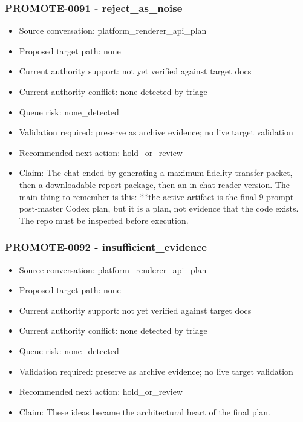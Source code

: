\documentclass[11pt,a4paper]{report}
\begin{document}
\subsubsection{PROMOTE-0091 - reject\_as\_noise}

\begin{itemize}
\item Source conversation: platform\_renderer\_api\_plan
\item Proposed target path: none
\item Current authority support: not yet verified against target docs
\item Current authority conflict: none detected by triage
\item Queue risk: none\_detected
\item Validation required: preserve as archive evidence; no live target validation
\item Recommended next action: hold\_or\_review
\item Claim: The chat ended by generating a maximum-fidelity transfer packet, then a downloadable report package, then an in-chat reader version. The main thing to remember is this: **the active artifact is the final 9-prompt post-master Codex plan, but it is a plan, not evidence that the code exists. The repo must be inspected before execution.
\end{itemize}

\subsubsection{PROMOTE-0092 - insufficient\_evidence}

\begin{itemize}
\item Source conversation: platform\_renderer\_api\_plan
\item Proposed target path: none
\item Current authority support: not yet verified against target docs
\item Current authority conflict: none detected by triage
\item Queue risk: none\_detected
\item Validation required: preserve as archive evidence; no live target validation
\item Recommended next action: hold\_or\_review
\item Claim: These ideas became the architectural heart of the final plan.
\end{itemize}
\end{document}
